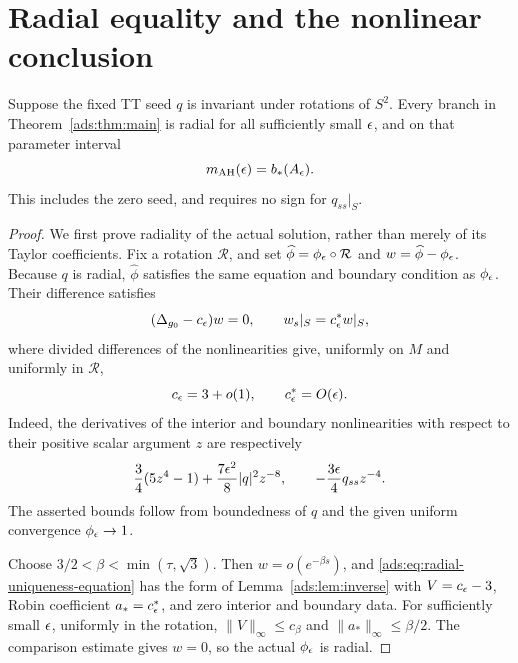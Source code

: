 \section{Radial equality and the nonlinear conclusion}
\label{ads:sec:conclusion}

\begin{proposition}
\label{ads:prop:radial}
Suppose the fixed TT seed $q$ is invariant under rotations of $S^2$.
Every branch in Theorem~\ref{ads:thm:main} is radial for all sufficiently
small $\epsilon$, and on that parameter interval
\[
 m_{\mathrm{AH}}(\epsilon)=b_*(A_\epsilon).
\]
This includes the zero seed, and requires no sign for $q_{ss}|_S$.
\end{proposition}

\begin{proof}
We first prove radiality of the actual solution, rather than merely
of its Taylor coefficients.  Fix a rotation $\mathcal R$, and set
$\widehat\phi=\phi_\epsilon\circ\mathcal R$ and
$w=\widehat\phi-\phi_\epsilon$.
Because $q$ is radial, $\widehat\phi$ satisfies the same equation and
boundary condition as $\phi_\epsilon$.  Their difference satisfies
\begin{equation}
 (\Delta_{g_0}-c_\epsilon)w=0,
 \qquad w_s|_S=c_\epsilon^*w|_S,
 \label{ads:eq:radial-uniqueness-equation}
\end{equation}
where divided differences of the nonlinearities give, uniformly on
$M$ and uniformly in $\mathcal R$,
\[
 c_\epsilon=3+o(1),\qquad c_\epsilon^*=O(\epsilon).
\]
Indeed, the derivatives of the interior and boundary nonlinearities
with respect to their positive scalar argument $z$ are respectively
\[
 \frac34(5z^4-1)+\frac{7\epsilon^2}{8}|q|^2z^{-8},
 \qquad -\frac{3\epsilon}{4}q_{ss}z^{-4}.
\]
The asserted bounds follow from boundedness of $q$ and the given
uniform convergence $\phi_\epsilon\to1$.

Choose $3/2<\beta<\min(\tau,\sqrt3)$. Then
$w=o(e^{-\beta s})$, and \eqref{ads:eq:radial-uniqueness-equation} has the
form of Lemma~\ref{ads:lem:inverse} with $V=c_\epsilon-3$, Robin coefficient
$a_*=c_\epsilon^*$, and zero interior and boundary data. For sufficiently
small $\epsilon$, uniformly in the rotation, $\|V\|_\infty\leq c_\beta$
and $\|a_*\|_\infty\leq\beta/2$. The comparison estimate gives $w=0$,
so the actual $\phi_\epsilon$ is radial.


\end{proof}
